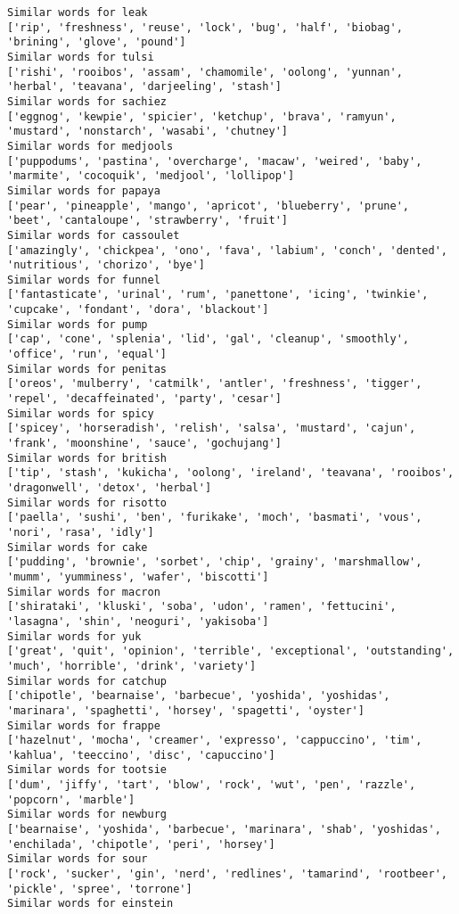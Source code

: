 \documentclass[11pt]{article}
\begin{document}
\begin{Verbatim}[commandchars=\\\{\}]
Similar words for leak
['rip', 'freshness', 'reuse', 'lock', 'bug', 'half', 'biobag', 'brining', 'glove', 'pound']
Similar words for tulsi
['rishi', 'rooibos', 'assam', 'chamomile', 'oolong', 'yunnan', 'herbal', 'teavana', 'darjeeling', 'stash']
Similar words for sachiez
['eggnog', 'kewpie', 'spicier', 'ketchup', 'brava', 'ramyun', 'mustard', 'nonstarch', 'wasabi', 'chutney']
Similar words for medjools
['puppodums', 'pastina', 'overcharge', 'macaw', 'weired', 'baby', 'marmite', 'cocoquik', 'medjool', 'lollipop']
Similar words for papaya
['pear', 'pineapple', 'mango', 'apricot', 'blueberry', 'prune', 'beet', 'cantaloupe', 'strawberry', 'fruit']
Similar words for cassoulet
['amazingly', 'chickpea', 'ono', 'fava', 'labium', 'conch', 'dented', 'nutritious', 'chorizo', 'bye']
Similar words for funnel
['fantasticate', 'urinal', 'rum', 'panettone', 'icing', 'twinkie', 'cupcake', 'fondant', 'dora', 'blackout']
Similar words for pump
['cap', 'cone', 'splenia', 'lid', 'gal', 'cleanup', 'smoothly', 'office', 'run', 'equal']
Similar words for penitas
['oreos', 'mulberry', 'catmilk', 'antler', 'freshness', 'tigger', 'repel', 'decaffeinated', 'party', 'cesar']
Similar words for spicy
['spicey', 'horseradish', 'relish', 'salsa', 'mustard', 'cajun', 'frank', 'moonshine', 'sauce', 'gochujang']
Similar words for british
['tip', 'stash', 'kukicha', 'oolong', 'ireland', 'teavana', 'rooibos', 'dragonwell', 'detox', 'herbal']
Similar words for risotto
['paella', 'sushi', 'ben', 'furikake', 'moch', 'basmati', 'vous', 'nori', 'rasa', 'idly']
Similar words for cake
['pudding', 'brownie', 'sorbet', 'chip', 'grainy', 'marshmallow', 'mumm', 'yumminess', 'wafer', 'biscotti']
Similar words for macron
['shirataki', 'kluski', 'soba', 'udon', 'ramen', 'fettucini', 'lasagna', 'shin', 'neoguri', 'yakisoba']
Similar words for yuk
['great', 'quit', 'opinion', 'terrible', 'exceptional', 'outstanding', 'much', 'horrible', 'drink', 'variety']
Similar words for catchup
['chipotle', 'bearnaise', 'barbecue', 'yoshida', 'yoshidas', 'marinara', 'spaghetti', 'horsey', 'spagetti', 'oyster']
Similar words for frappe
['hazelnut', 'mocha', 'creamer', 'expresso', 'cappuccino', 'tim', 'kahlua', 'teeccino', 'disc', 'capuccino']
Similar words for tootsie
['dum', 'jiffy', 'tart', 'blow', 'rock', 'wut', 'pen', 'razzle', 'popcorn', 'marble']
Similar words for newburg
['bearnaise', 'yoshida', 'barbecue', 'marinara', 'shab', 'yoshidas', 'enchilada', 'chipotle', 'peri', 'horsey']
Similar words for sour
['rock', 'sucker', 'gin', 'nerd', 'redlines', 'tamarind', 'rootbeer', 'pickle', 'spree', 'torrone']
Similar words for einstein

\end{Verbatim}
\end{document}
